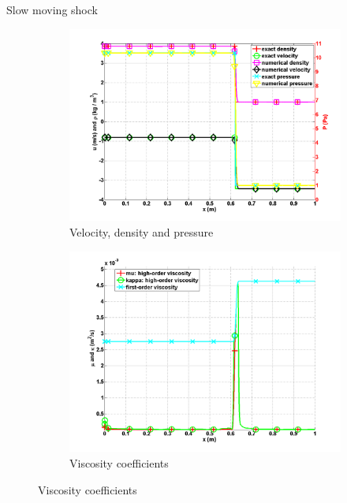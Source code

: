 \documentclass[xcolor=dvipsnames,10pt]{beamer}
\begin{document}
\begin{frame}{Slow moving shock}
\begin{figure}[H]
        \centering
        \begin{subfigure}[b]{0.5\textwidth}
                \centering
                \includegraphics[width=\textwidth]{../figures/SlowMovingShock_density_velocity_pressure_profiles.png}
                \caption{Velocity, density and pressure}
                \label{fig:profiles_sms}
        \end{subfigure}%
        \begin{subfigure}[b]{0.5\textwidth}
                \centering
                \includegraphics[width=\textwidth]{../figures/SlowMovingShock_viscosity.png}
                \caption{Viscosity coefficients}
                \label{fig:viscosity_sms}
        \end{subfigure} 
\end{figure} 
\end{frame}
\end{document}
